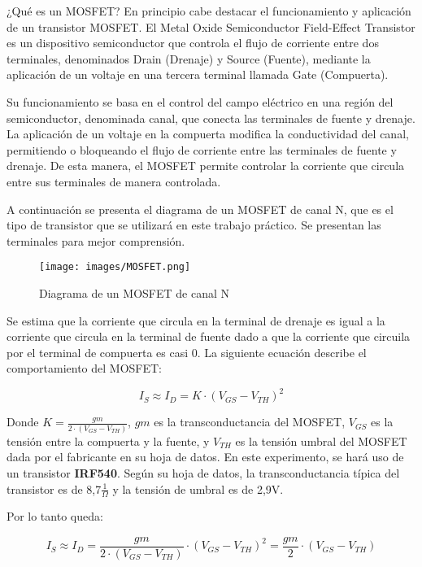\documentclass[12pt,oneside,a4paper]{article}
\begin{document}
¿Qué es un MOSFET? En principio cabe destacar el funcionamiento y aplicación de un transistor MOSFET.
El Metal Oxide Semiconductor Field-Effect Transistor es un dispositivo 
semiconductor que controla el flujo de corriente entre dos terminales, denominados Drain (Drenaje) 
y Source (Fuente), mediante la aplicación de un voltaje en una tercera terminal llamada Gate (Compuerta).

Su funcionamiento se basa en el control del campo eléctrico en una región del semiconductor, denominada 
canal, que conecta las terminales de fuente y drenaje. La aplicación de un voltaje en la compuerta
modifica la conductividad del canal, permitiendo o bloqueando el flujo de corriente entre las terminales
de fuente y drenaje. De esta manera, el MOSFET permite controlar la corriente que circula entre sus terminales 
de manera controlada.

A continuación se presenta el diagrama de un MOSFET de canal N, que es el tipo de transistor que se utilizará 
en este trabajo práctico. Se presentan las terminales para mejor comprensión.

\begin{figure}[H]
    \centering
    \texttt{[image: images/MOSFET.png]}
    \caption{Diagrama de un MOSFET de canal N}
\end{figure}

Se estima que la corriente que circula en la terminal de drenaje es igual a la corriente que circula
en la terminal de fuente dado a que la corriente que circuila por el terminal de compuerta es casi 0. 
La siguiente ecuación describe el comportamiento del MOSFET:

\begin{equation}
    I_S \approx I_D = K \cdot (V_{GS} - V_{TH})^2
\end{equation}

Donde $ K = \frac{gm}{2\cdot (V_{GS} - V_{TH})} $, $ gm $ es la transconductancia del MOSFET, $ V_{GS} $ 
es la tensión entre la compuerta y la fuente, y $ V_{TH} $ es la tensión umbral del MOSFET dada por 
el fabricante en su hoja de datos. En este experimento, 
se hará uso de un transistor \textbf{IRF540}. Según su hoja de datos, la transconductancia típica del transistor 
es de 8,7$\frac{1}{\Omega}$ y la tensión de umbral es de 2,9V.

Por lo tanto queda:

\begin{equation}
    I_S \approx I_D = \frac{gm}{2\cdot (V_{GS} - V_{TH})} \cdot (V_{GS} - V_{TH})^2 = \frac{gm}{2} \cdot (V_{GS} - V_{TH})
\end{equation}
\end{document}
